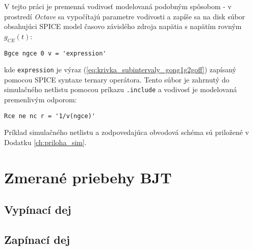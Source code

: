 V tejto práci je premenná vodivosť modelovaná podobným spôsobom - v prostredí \textit{Octave} sa vypočítajú parametre vodivosti a zapíše sa na disk súbor obsahujúci SPICE model časovo závislého zdroja napätia s napätím rovným $g_{CE}(t)$:
\begin{verbatim}
Bgce ngce 0 v = 'expression'
\end{verbatim}
kde \texttt{expression} je výraz (\ref{eq:krivka_subintervaly_gong1g2goff}) zapísaný pomocou SPICE syntaxe ternary operátora. Tento súbor je zahrnutý do simulačného netlistu pomocou príkazu \texttt{.include} a vodivosť je modelovaná premenlivým odporom:
\begin{verbatim}
Rce ne nc r = '1/v(ngce)'
\end{verbatim}

Príklad simulačného netlistu a zodpovedajúca obvodová schéma sú priložené v Dodatku \ref{ch:priloha_sim}.

\newpage
\section{Zmerané priebehy BJT} \label{sec:vysl_BJT}

\subsection{Vypínací dej}





\FloatBarrier


\subsection{Zapínací dej}

